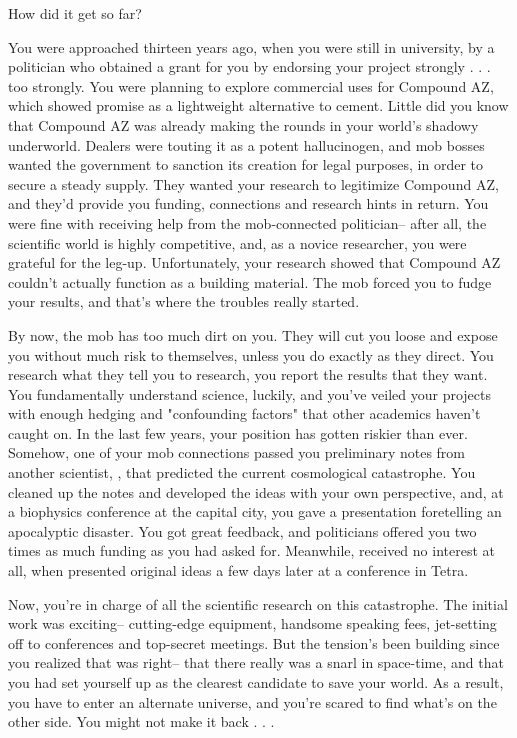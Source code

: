 \documentclass[char]{guildcamp3}
\begin{document}
\name{\cSciOne{}}



How did it get so far?

You were approached thirteen years ago, when you were still in university, by a politician who obtained a grant for you by endorsing your project strongly . . . too strongly. You were planning to explore commercial uses for Compound AZ, which showed promise as a lightweight alternative to cement. Little did you know that Compound AZ was already making the rounds in your world's shadowy underworld. Dealers were touting it as a potent hallucinogen, and mob bosses wanted the government to sanction its creation for legal purposes, in order to secure a steady supply. They wanted your research to legitimize Compound AZ, and they'd provide you funding, connections and research hints in return. You were fine with receiving help from the mob-connected politician-- after all, the scientific world is highly competitive, and, as a novice researcher, you were grateful for the leg-up. Unfortunately, your research showed that Compound AZ couldn't actually function as a building material. The mob forced you to fudge your results, and that's where the troubles really started.

By now, the mob has too much dirt on you. They will cut you loose and expose you without much risk to themselves, unless you do exactly as they direct. You research what they tell you to research, you report the results that they want. You fundamentally understand science, luckily, and you've veiled your projects with enough hedging and "confounding factors" that other academics haven't caught on. In the last few years, your position has gotten riskier than ever. Somehow, one of your mob connections passed you preliminary notes from another scientist, \cSciTwo{}, that predicted the current cosmological catastrophe. You cleaned up the notes and developed the ideas with your own perspective, and, at a biophysics conference at the capital city, you gave a presentation foretelling an apocalyptic disaster. You got great feedback, and politicians offered you two times as much funding as you had asked for. Meanwhile, \cSciTwo{} received no interest at all, when \cSciTwo{\they} presented \cSciTwo{\their} original ideas a few days later at a conference in Tetra.

Now, you're in charge of all the scientific research on this catastrophe. The initial work was exciting-- cutting-edge equipment, handsome speaking fees, jet-setting off to conferences and top-secret meetings. But the tension's been building since you realized that \cSciTwo{} was right-- that there really was a snarl in space-time, and that you had set yourself up as the clearest candidate to save your world. As a result, you have to enter an alternate universe, and you're scared to find what's on the other side. You might not make it back . . .
\end{document}
